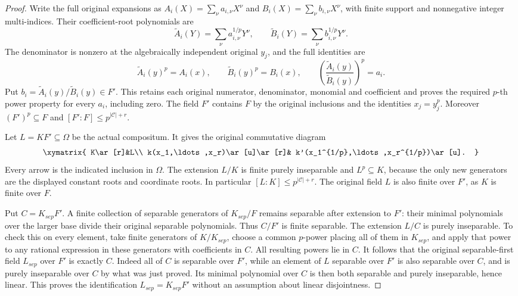 \begin{proof}
Write the full original expansions as
$A_i(X)=\sum_\nu a_{i,\nu}X^\nu$ and
$B_i(X)=\sum_\nu b_{i,\nu}X^\nu$, with finite
support and nonnegative integer multi-indices.
Their coefficient-root polynomials are
$$
\widetilde A_i(Y)=\sum_\nu a_{i,\nu}^{1/p}Y^\nu,
\qquad
\widetilde B_i(Y)=\sum_\nu b_{i,\nu}^{1/p}Y^\nu.
$$
The denominator is nonzero at the algebraically
independent original $y_j$, and the full identities
are
$$
\widetilde A_i(y)^p=A_i(x),\qquad
\widetilde B_i(y)^p=B_i(x),\qquad
\left(\frac{\widetilde A_i(y)}{\widetilde B_i(y)}\right)^p=a_i.
$$
Put $b_i=\widetilde A_i(y)/\widetilde B_i(y)\in F'$.
This retains each original numerator, denominator,
monomial and coefficient and proves the required
$p$-th power property for every $a_i$, including zero.
The field $F'$ contains $F$ by the original
inclusions and the identities $x_j=y_j^p$.
Moreover $(F')^p\subseteq F$ and
$[F':F]\leq p^{|\mathcal C|+r}$.

Let $L=KF'\subseteq\Omega$ be the actual compositum.
It gives the original commutative diagram
$$
\xymatrix{
K\ar[r]&L\\
k(x_1,\ldots,x_r)\ar[u]\ar[r]&
k'(x_1^{1/p},\ldots,x_r^{1/p})\ar[u].
}
$$
Every arrow is the indicated inclusion in $\Omega$.
The extension $L/K$ is finite purely inseparable
and $L^p\subseteq K$, because the only new
generators are the displayed constant roots
and coordinate roots. In particular
$[L:K]\leq p^{|\mathcal C|+r}$.
The original field $L$ is also finite over $F'$,
as $K$ is finite over $F$.

Put $C=K_{sep}F'$. A finite collection of separable
generators of $K_{sep}/F$ remains separable after
extension to $F'$: their minimal polynomials over
the larger base divide their original separable
polynomials. Thus $C/F'$ is finite separable.
The extension $L/C$ is purely inseparable. To
check this on every element, take finite
generators of $K/K_{sep}$, choose a common
$p$-power placing all of them in $K_{sep}$,
and apply that power to any rational expression
in these generators with coefficients in $C$.
All resulting powers lie in $C$.
It follows that the original separable-first
field $L_{sep}$ over $F'$ is exactly $C$.
Indeed all of $C$ is separable over $F'$, while
an element of $L$ separable over $F'$ is also
separable over $C$, and is purely inseparable
over $C$ by what was just proved. Its minimal
polynomial over $C$ is then both separable and
purely inseparable, hence linear. This proves
the identification $L_{sep}=K_{sep}F'$ without
an assumption about linear disjointness.


\end{proof}

